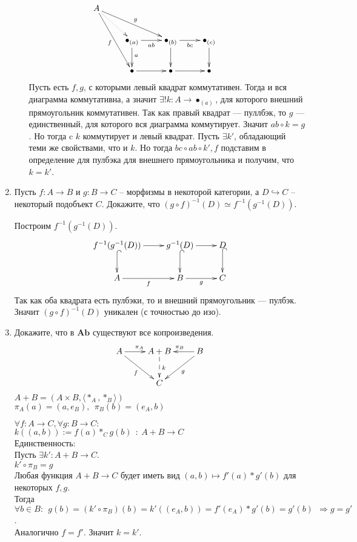 \documentclass[draft]{article}
\newcommand{\cat}[1]{\mathbf{#1}}
\newcommand{\Ab}{\cat{Ab}}
\begin{document}
\begin{enumerate}
\begin{itemize}
\[ \xymatrix{ 
A \ar@{..>}[dr] \ar[ddr]_f \ar[rrd]^g & & & &\\
& \bullet_{(a)} \ar[r]_{ab} \ar[d]^a & \bullet_{(b)} \ar[r]_{bc} \ar[d] & \bullet_{(c)} \ar[d]\\
& \bullet \ar[r]      & \bullet \ar[r]        & \bullet
} \]
Пусть есть $f, g$, с которыми левый квадрат коммутативен. Тогда и вся диаграмма коммутативна, а значит $\exists!k : A \to \bullet_{(a)}$, для которого внешний прямоугольник коммутативен. Так как правый квадрат --- пуллбэк, то $g$ --- единственный, для которого вся диаграмма коммутирует. Значит $ab \circ k = g$. Но тогда c $k$ коммутирует и левый квадрат. Пусть  $\exists k'$, обладающий теми же свойствами, что и $k$. Но тогда $bc\circ ab \circ k', f$ подставим в определение для пулбэка для внешнего прямоугольника и получим, что $k = k'$.


\end{itemize}
\newpage
\item Пусть $f : A \to B$ и $g : B \to C$ -- морфизмы в некоторой категории, а $D \hookrightarrow C$ -- некоторый подобъект $C$.
Докажите, что $(g \circ f)^{-1}(D) \simeq f^{-1}(g^{-1}(D))$.

Построим $f^{-1}(g^{-1}(D))$.
\[
\xymatrix{
f^{-1}(g^{-1}(D)) \ar[r] \ar@{^{(}->}[d] & g^{-1}(D) \ar[r] \ar@{^{(}->}[d] & D \ar@{^{(}->}[d]\\
A \ar[r]_f & B \ar[r]_g & C
}
\]
Так как оба квадрата есть пулбэки, то и внешний прямоугольник --- пулбэк. Значит $(g \circ f)^{-1}(D)$ уникален (с точностью до изо).

\item Докажите, что в $\Ab$ существуют все копроизведения.\\

\[ \xymatrix{ 
A\ar[r]^{\pi_A} \ar[dr]_{f} & A+B \ar@{-->}[d]^k & B \ar[l]_{\pi_B} \ar[ld]^{g}\\
 & C&
} \]
$A+B = (A\times B, \langle \ast_A, \ast_B\rangle)$\\
$\pi_A(a) = (a, e_B),~~\pi_B(b) = (e_A, b)$

$\forall f : A \to C, \forall g : B \to C:$\\
$k((a, b)) := f(a)\ast_C g(b) ~~:~A+B \to C$\\

Единственность:\\
Пусть $\exists k': A+B\to C$.\\
$k' \circ \pi_B = g$\\
Любая функция $A+B\to C$ будет иметь вид $(a, b)\mapsto f'(a)\ast g'(b)$ для некоторых $f, g$. \\
Тогда $\forall b \in B:~~ g(b) = (k' \circ \pi_B)(b) = k'((e_A, b)) = f'(e_A)\ast g'(b) = g'(b)~~\Rightarrow g = g'$.\\
Аналогично $f = f'$. Значит $k=k'$.


\end{enumerate}
\end{document}
